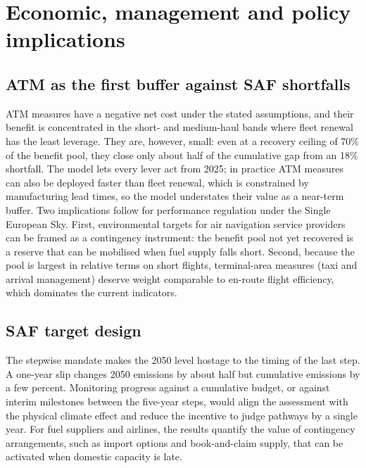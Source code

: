 \documentclass[preprint, 12pt, authoryear]{elsarticle}
\begin{document}
\section{Economic, management and policy implications}
\label{sec:discussion}

\subsection{ATM as the first buffer against SAF shortfalls}

ATM measures have a negative net cost under the stated assumptions, and their
benefit is concentrated in the short- and medium-haul bands where fleet renewal has the
least leverage. They are, however, small: even at a recovery ceiling of 70\% of
the benefit pool, they close only about half of the cumulative gap from an 18\%
shortfall. The model lets every lever act from 2025; in practice ATM measures
can also be deployed faster than fleet renewal, which is constrained by
manufacturing lead times, so the model understates their value as a near-term
buffer. Two implications follow for performance regulation under the Single
European Sky. First, environmental targets for air navigation service providers
can be framed as a contingency instrument: the benefit pool not yet recovered is
a reserve that can be mobilised when fuel supply falls short. Second, because
the pool is largest in relative terms on short flights, terminal-area measures
(taxi and arrival management) deserve weight comparable to en-route flight
efficiency, which dominates the current indicators.

\subsection{SAF target design}

The stepwise mandate makes the 2050 level hostage to the timing of the last
step. A one-year slip changes 2050 emissions by about half but cumulative
emissions by a few percent. Monitoring progress against a cumulative budget, or
against interim milestones between the five-year steps, would align the
assessment with the physical climate effect and reduce the incentive to judge
pathways by a single year. For fuel suppliers and airlines, the results quantify
the value of contingency arrangements, such as import options and book-and-claim
supply, that can be activated when domestic capacity is late.
\end{document}
